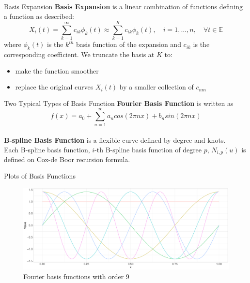 \documentclass{beamer}
\begin{document}
	\begin{frame}{Basis Expansion}
		\textbf{Basis Expansion} is a linear combination of functions defining a function as described:
		$$X_{i}(t) = \sum_{k=1}^{\infty} c_{ik}\phi_{k}(t) \approx \sum_{k=1}^{K} c_{ik}\phi_{k}(t), \quad i = 1, \dots, n, \quad \forall t \in \mathbb{E}$$
		where $\phi_{k}(t)$ is the $k^{th}$ basis function of the expansion and $c_{ik}$ is the corresponding coefficient. We truncate the basis at $K$ to:
		\vspace{0.2cm}
		
		\begin{itemize}
			\item make the function smoother
			\item replace the original curves $X_{i}(t)$ by a smaller collection of $c_{nm}$
		\end{itemize}		
	\end{frame}
	
	\begin{frame}{Two Typical Types of Basis Function}
		\textbf{Fourier Basis Function} is written as
		$$f(x) = a_{0} + \sum_{n=1}^{\infty}a_{n}cos(2\pi nx) + b_{n}sin(2\pi nx)$$	\\
		\vspace{2\baselineskip}
		\textbf{B-spline Basis Function} is a flexible curve defined by degree and knots. \\
		Each B-spline basis function, $i$-th B-spline basis function of degree $p$, $N_{i,p}(u)$ is defined on Cox-de Boor recursion formula.
	\end{frame}
	
	\begin{frame}{Plots of Basis Functions}
		\begin{figure}
			\includegraphics[height = 4.5cm]{../Graphics/Fourier_Basis.pdf}
			\caption {Fourier basis functions with order 9}
		\end{figure}
			
	\end{frame}
	
\end{document}
